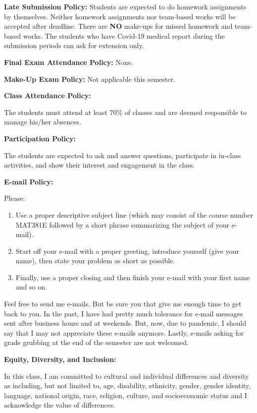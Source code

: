 \documentclass[
  12pt,
]{article}
\providecommand{\tightlist}{%
  \setlength{\itemsep}{0pt}\setlength{\parskip}{0pt}}
\begin{document}
\textbf{Late Submission Policy:} Students are expected to do homework
assignments by themselves. Neither homework assignments nor team-based
works will be accepted after deadline. There are \textbf{NO} make-ups
for missed homework and team-based works. The students who have Covid-19
medical report during the submission periods can ask for extension only.

\textbf{Final Exam Attendance Policy:} None.

\textbf{Make-Up Exam Policy:} Not applicable this semester.

\textbf{Class Attendance Policy:}

The students must attend at least 70\% of classes and are deemed
responsible to manage his/her absences.

\textbf{Participation Policy:}

The students are expected to ask and answer questions, participate in
in-class activities, and show their interest and engagement in the
class.

\textbf{E-mail Policy:}

Please:

\begin{enumerate}
\def\labelenumi{\arabic{enumi}.}
\tightlist
\item
  Use a proper descriptive subject line (which may consist of the course
  number MAT381E followed by a short phrase summarizing the subject of
  your e-mail).
\item
  Start off your e-mail with a proper greeting, introduce yourself (give
  your name), then state your problem as short as possible.
\item
  Finally, use a proper closing and then finish your e-mail with your
  first name and so on.
\end{enumerate}

Feel free to send me e-mails. But be sure you that give me enough time
to get back to you. In the past, I have had pretty much tolerance for
e-mail messages sent after business hours and at weekends. But, now, due
to pandemic, I should say that I may not appreciate these e-mails
anymore. Lastly, e-mails asking for grade grubbing at the end of the
semester are not welcomed.

\textbf{Equity, Diversity, and Inclusion:}

In this class, I am committed to cultural and individual differences and
diversity as including, but not limited to, age, disability, ethnicity,
gender, gender identity, language, national origin, race, religion,
culture, and socioeconomic status and I acknowledge the value of
differences.
\end{document}
